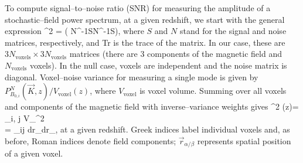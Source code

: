 To compute signal--to--noise ratio (SNR) for measuring the amplitude of a stochastic--field power spectrum, at a given redshift, we start with the general expression  
\beq
{}^2 =   \left( N^{-1}SN^{-1}S\right),
\label{eq:snr_general}
\eeq
where $S$ and $N$ stand for the signal and noise matrices, respectively, and Tr is the trace of the matrix. In our case, these are $3N_\text{voxels}\times 3N_\text{voxels}$ matrices (there are 3 components of the magnetic field and $N_\text{voxels}$ voxels). In the null case, voxels are independent and the noise matrix is diagonal. Voxel--noise  variance for measuring a single mode is given by $P^N_{B_{0,i}}(\vec K, z)/V_\text{voxel} (z)$, where $V_\text{voxel}$ is voxel volume. Summing over all voxels and components of the magnetic field with inverse--variance weights gives
\beq
\bga
{}^2 (z)=  \sum_{i\alpha, j\beta}  V_^2\\=
 \sum_{ij} \int d\vec r_\alpha \int d\vec r_\beta {},
\ega
\label{eq:snr_z_step1}
\eeq
at a given redshift. Greek indices label individual voxels and, as before, Roman indices denote field components; $\vec r_{\alpha/\beta}$ represents spatial position of a given voxel. 

